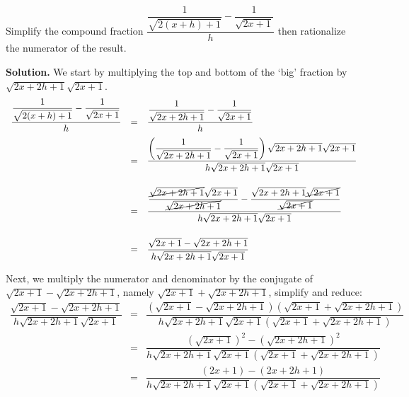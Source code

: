 \begin{ex} \label{rationalizenumdenombosslevel}

Simplify the compound fraction $\dfrac{\dfrac{1}{\sqrt{2(x+h)+1}} - \dfrac{1}{\sqrt{2x+1}}}{h}$ then rationalize the numerator of the result.

\medskip

{\bf Solution.} We start by multiplying the top and bottom of the `big' fraction by $\sqrt{2x+2h+1} \sqrt{2x+1}$.  \[ \begin{array}{rcl}

\dfrac{\dfrac{1}{\sqrt{2(x+h)+1}} - \dfrac{1}{\sqrt{2x+1}}}{h} & = & \dfrac{\dfrac{1}{\sqrt{2x+2h+1}} - \dfrac{1}{\sqrt{2x+1}}}{h}\\[10pt]

                                                               & = & \dfrac{\left(\dfrac{1}{\sqrt{2x+2h+1}} - \dfrac{1}{\sqrt{2x+1}}\right) \sqrt{2x+2h+1} \sqrt{2x+1}}{h\sqrt{2x+2h+1} \sqrt{2x+1}}\\[22pt]
																															
																															& = & \dfrac{\dfrac{\cancel{\sqrt{2x+2h+1}}\sqrt{2x+1}}{\cancel{\sqrt{2x+2h+1}}} - \dfrac{\sqrt{2x+2h+1} \cancel{\sqrt{2x+1}}}{\cancel{\sqrt{2x+1}}}}{h\sqrt{2x+2h+1} \sqrt{2x+1}}\\[22pt]
																																			
																															& = & \dfrac{\sqrt{2x + 1}- \sqrt{2x+2h+1}}{h\sqrt{2x+2h+1} \sqrt{2x+1}}\\	
																															\end{array}\]
																															
Next, we multiply the numerator and denominator by the conjugate of $\sqrt{2x+1} - \sqrt{2x+2h+1}$, namely $\sqrt{2x+1} + \sqrt{2x+2h+1}$, simplify and reduce:\[\begin{array}{rcl}

 \dfrac{\sqrt{2x + 1}- \sqrt{2x+2h+1}}{h\sqrt{2x+2h+1} \sqrt{2x+1}} & = & \dfrac{(\sqrt{2x+1} - \sqrt{2x+2h+1})(\sqrt{2x+1} + \sqrt{2x+2h+1})}{h\sqrt{2x+2h+1} \sqrt{2x+1}(\sqrt{2x+1} + \sqrt{2x+2h+1})} \\ [20pt]

 & = & \dfrac{(\sqrt{2x+1})^2 - (\sqrt{2x+2h+1})^2}{h\sqrt{2x+2h+1} \sqrt{2x+1}(\sqrt{2x+1} + \sqrt{2x+2h+1})} \\[20pt]

 & = & \dfrac{(2x+1) - (2x+2h+1)}{h\sqrt{2x+2h+1} \sqrt{2x+1}(\sqrt{2x+1} + \sqrt{2x+2h+1})} \\[20pt]


\end{array}\]
\end{ex}
